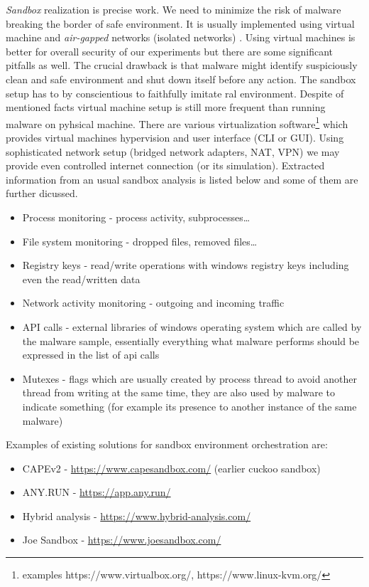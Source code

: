 \emph{Sandbox} realization is precise work. We need to minimize the risk of malware breaking the border of safe environment. It is usually implemented using virtual machine and \emph{air-gapped} networks (isolated networks) \cite{Sikorski2012}. Using virtual machines is better for overall security of our experiments but there are some significant pitfalls as well. The crucial drawback is that malware might identify suspiciously clean and safe environment and shut down itself before any action. The sandbox setup has to by conscientious to faithfully imitate ral environment. Despite of mentioned facts virtual machine setup is still more frequent than running malware on pyhsical machine. There are various virtualization software\footnote{examples https://www.virtualbox.org/, https://www.linux-kvm.org/} which provides virtual machines hypervision and user interface (CLI or GUI). Using sophisticated network setup (bridged network adapters, NAT, VPN) we may provide even controlled internet connection (or its simulation). Extracted information from an usual sandbox analysis is listed below and some of them are further dicussed.

\begin{itemize}
  \item Process monitoring - process activity, subprocesses\dots
  \item File system monitoring - dropped files, removed files\dots
  \item Registry keys - read/write operations with windows registry keys including even the read/written data
  \item Network activity monitoring - outgoing and incoming traffic
  \item API calls - external libraries of windows operating system which are called by the malware sample, essentially everything what malware performs should be expressed in the list of api calls
  \item Mutexes - flags which are usually created by process thread to avoid another thread from writing at the same time, they are also used by malware to indicate something (for example its presence to another instance of the same malware)
\end{itemize}


Examples of existing solutions for sandbox environment orchestration are:
\begin{itemize}
  \item CAPEv2 - \url{https://www.capesandbox.com/} (earlier cuckoo sandbox)
  \item ANY.RUN - \url{https://app.any.run/}
  \item Hybrid analysis - \url{https://www.hybrid-analysis.com/}
  \item Joe Sandbox - \url{https://www.joesandbox.com/}
\end{itemize}

